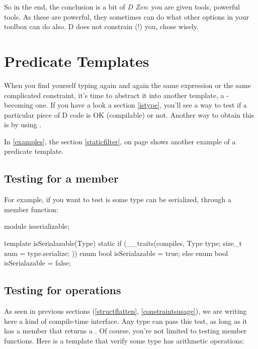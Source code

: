 So in the end, the conclusion is a bit of \emph{D Zen}: you are given tools, powerful tools. As these are powerful, they sometimes can do what other options in your toolbox can do also. D does not constrain (!) you, chose wisely.

\section{Predicate Templates}\label{predicates}

When you find yourself typing again and again the same  expression or the same complicated constraint, it's time to abstract it into another template, a -becoming one. If you have a look a section \ref{istype}, you'll see a way to test if a particular piece of D code is OK (compilable) or not. Another way to obtain this is by using .

In \autoref{examples}, the section \ref{staticfilter}, on page \pageref{graphcheck} shows another example of a predicate template.

\subsection{Testing for a member}

For example, if you want to test is some type can be serialized, through a  member function:

\begin{dcode}
module isserializable;

template isSerialazable(Type)
{
    static if (__traits(compiles, {
                                   Type type;
                                   size_t num = type.serialize;
                                  }))
        enum bool isSerialazable = true;
    else
        enum bool isSerialazable = false;
}
\end{dcode}

\subsection{Testing for operations}

As seen in previous sections (\ref{structflatten}, \ref{constraintsusage}), we are writing here a kind of compile-time interface. Any type can pass this test, as long as it has a  member that returns a . Of course, you're not limited to testing member functions. Here is a template that verify some type has arithmetic operations:

